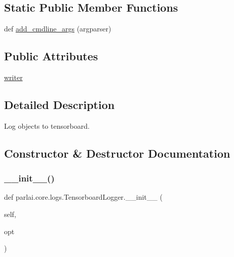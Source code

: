 \subsection*{Static Public Member Functions}
\begin{DoxyCompactItemize}
\item 
def \hyperlink{classparlai_1_1core_1_1logs_1_1TensorboardLogger_a22488a4b41a75dce0a1c467418882e83}{add\+\_\+cmdline\+\_\+args} (argparser)
\end{DoxyCompactItemize}
\subsection*{Public Attributes}
\begin{DoxyCompactItemize}
\item 
\hyperlink{classparlai_1_1core_1_1logs_1_1TensorboardLogger_afc71d93e950d01b95fc824d347907a58}{writer}
\end{DoxyCompactItemize}


\subsection{Detailed Description}
\begin{DoxyVerb}Log objects to tensorboard.
\end{DoxyVerb}
 

\subsection{Constructor \& Destructor Documentation}
\mbox{\label{classparlai_1_1core_1_1logs_1_1TensorboardLogger_a771ea3df52af2ad82a038446fb15fdf3}} 
\subsubsection{\texorpdfstring{\+\_\+\+\_\+init\+\_\+\+\_\+()}{\_\_init\_\_()}}
{\footnotesize\ttfamily def parlai.\+core.\+logs.\+Tensorboard\+Logger.\+\_\+\+\_\+init\+\_\+\+\_\+ (\begin{DoxyParamCaption}\item[{}]{self,  }\item[{}]{opt }\end{DoxyParamCaption})}




